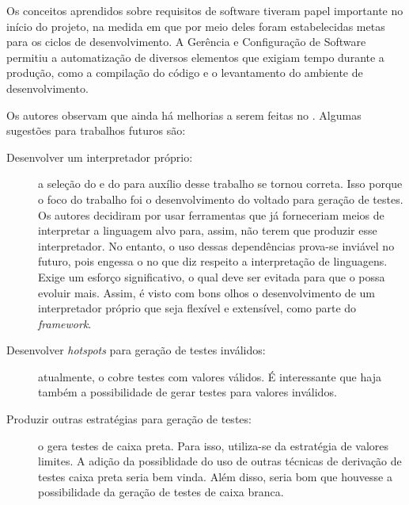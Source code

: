 Os conceitos aprendidos sobre  requisitos de software tiveram papel importante no início
do projeto, na medida em que por meio deles foram estabelecidas metas para os
ciclos de desenvolvimento. A Gerência e Configuração de Software permitiu a
automatização de diversos elementos que exigiam tempo durante a produção,
como a compilação do código e o levantamento do ambiente de desenvolvimento.


Os autores observam que ainda há melhorias a serem feitas no \Scarefault. Algumas
sugestões para trabalhos futuros são:

\begin{description}
\item[Desenvolver um interpretador próprio:] a seleção do \flexcpp e do \bisoncpp para
auxílio desse trabalho se tornou correta. Isso porque o foco do trabalho foi o
desenvolvimento do \framework voltado para geração de testes. Os autores decidiram
por usar ferramentas que já forneceriam meios de interpretar a linguagem alvo para,
assim, não terem que produzir esse interpretador. No entanto, o uso dessas
dependências prova-se inviável no futuro, pois engessa o \framework no que diz
respeito a interpretação de linguagens. Exige um esforço significativo, o qual deve ser evitada
para que o \scarefault possa evoluir mais. Assim, é visto com bons olhos o
desenvolvimento de um interpretador próprio que seja flexível e extensível, como
parte do \textit{framework}.
\item[Desenvolver \textit{hotspots} para geração de testes inválidos:] atualmente,
o \scarefault cobre testes com valores válidos. É interessante que haja também a
possibilidade de gerar testes para valores inválidos.
\item[Produzir outras estratégias para geração de testes:] o \scarefault gera
testes de caixa preta. Para isso, utiliza-se da estratégia de valores limites. A
adição da possiblidade do uso de outras técnicas de derivação de testes caixa preta
seria bem vinda. Além disso, seria bom que houvesse a possibilidade da geração
de testes de caixa branca.
\end{description}
